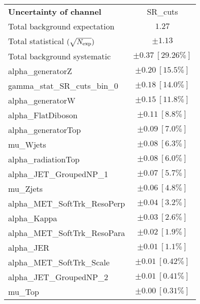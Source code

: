 
\begin{table}
\begin{center}
\setlength{\tabcolsep}{0.0pc}
\begin{tabular*}{\textwidth}{@{\extracolsep{\fill}}lc}
\noalign{\smallskip}\hline\noalign{\smallskip}
{\bf Uncertainty of channel}                                    & SR\_cuts            \\
\noalign{\smallskip}\hline\noalign{\smallskip}
Total background expectation             &  $1.27$       \\
\noalign{\smallskip}\hline\noalign{\smallskip}
Total statistical $(\sqrt{N_{\rm exp}})$              & $\pm 1.13$       \\
Total background systematic               & $\pm 0.37\ [29.26\%] $             \\
\noalign{\smallskip}\hline\noalign{\smallskip}
\noalign{\smallskip}\hline\noalign{\smallskip}
alpha\_generatorZ         & $\pm 0.20\ [15.5\%] $       \\
gamma\_stat\_SR\_cuts\_bin\_0         & $\pm 0.18\ [14.0\%] $       \\
alpha\_generatorW         & $\pm 0.15\ [11.8\%] $       \\
alpha\_FlatDiboson         & $\pm 0.11\ [8.8\%] $       \\
alpha\_generatorTop         & $\pm 0.09\ [7.0\%] $       \\
mu\_Wjets         & $\pm 0.08\ [6.3\%] $       \\
alpha\_radiationTop         & $\pm 0.08\ [6.0\%] $       \\
alpha\_JET\_GroupedNP\_1         & $\pm 0.07\ [5.7\%] $       \\
mu\_Zjets         & $\pm 0.06\ [4.8\%] $       \\
alpha\_MET\_SoftTrk\_ResoPerp         & $\pm 0.04\ [3.2\%] $       \\
alpha\_Kappa         & $\pm 0.03\ [2.6\%] $       \\
alpha\_MET\_SoftTrk\_ResoPara         & $\pm 0.02\ [1.9\%] $       \\
alpha\_JER         & $\pm 0.01\ [1.1\%] $       \\
alpha\_MET\_SoftTrk\_Scale         & $\pm 0.01\ [0.42\%] $       \\
alpha\_JET\_GroupedNP\_2         & $\pm 0.01\ [0.41\%] $       \\
mu\_Top         & $\pm 0.00\ [0.31\%] $       \\

\end{tabular*}
\end{center}
\end{table}
